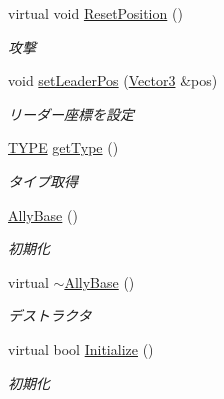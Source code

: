 \begin{DoxyCompactItemize}
virtual void \hyperlink{class_ally_base_a1ebb65212a5825c9a0894b008b19dfd3}{Reset\-Position} ()
\begin{DoxyCompactList}\small\item\em 攻撃 \end{DoxyCompactList}\item 
void \hyperlink{class_ally_base_a56952ebd77a64f24691d36e10db0abf5}{set\-Leader\-Pos} (\hyperlink{struct_vector3}{Vector3} \&pos)
\begin{DoxyCompactList}\small\item\em リーダー座標を設定 \end{DoxyCompactList}\item 
\hyperlink{class_ally_base_a415be0ac5999cacff3c36db435115e91}{T\-Y\-P\-E} \hyperlink{class_ally_base_a9c3306fa9eafbe909e733d4bf109416e}{get\-Type} ()
\begin{DoxyCompactList}\small\item\em タイプ取得 \end{DoxyCompactList}\end{DoxyCompactItemize}
{\bf }\par
\begin{DoxyCompactItemize}
\item 
\hyperlink{class_ally_base_a17d06a89e920ac54909e291c3a485b6f}{Ally\-Base} ()
\begin{DoxyCompactList}\small\item\em 初期化 \end{DoxyCompactList}\item 
virtual \hyperlink{class_ally_base_ac2f1c59ac703ccb4352ceb4e1805122e}{$\sim$\-Ally\-Base} ()
\begin{DoxyCompactList}\small\item\em デストラクタ \end{DoxyCompactList}\item 
virtual bool \hyperlink{class_ally_base_a8deb60628340c7a2567fda3bd54ac967}{Initialize} ()
\begin{DoxyCompactList}\small\item\em 初期化 \end{DoxyCompactList}\end{DoxyCompactItemize}


